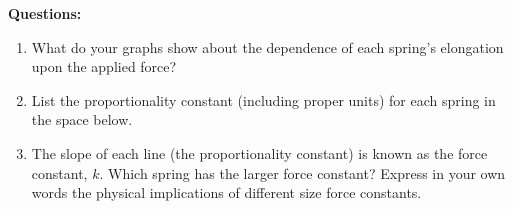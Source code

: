 \pagebreak

\textbf{Questions:}

\begin{enumerate}
\item What do your graphs show about the dependence of each spring's elongation upon the applied force?\vspace{30mm}

\item List the proportionality constant (including proper units) for each spring in the space below.\vspace{30mm}

\item The slope of each line (the proportionality constant) is known as the force constant, $k$. Which spring has the larger force constant? Express in your own words the physical implications of different size force constants.
\end{enumerate}
